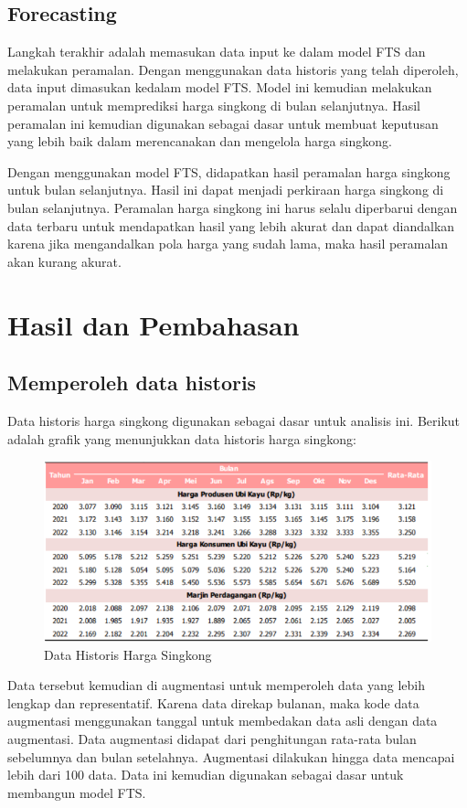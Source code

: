 \documentclass[conference]{IEEEtran}
\begin{document}
    
\subsection{Forecasting}
Langkah terakhir adalah memasukan data input ke dalam model FTS dan melakukan peramalan. Dengan menggunakan data historis yang telah diperoleh, data input dimasukan kedalam model FTS. Model ini kemudian melakukan peramalan untuk memprediksi harga singkong di bulan selanjutnya. Hasil peramalan ini kemudian digunakan sebagai dasar untuk membuat keputusan yang lebih baik dalam merencanakan dan mengelola harga singkong. 

Dengan menggunakan model FTS, didapatkan hasil peramalan harga singkong untuk bulan selanjutnya. Hasil ini dapat menjadi perkiraan harga singkong di bulan selanjutnya. Peramalan harga singkong ini harus selalu diperbarui dengan data terbaru untuk mendapatkan hasil yang lebih akurat dan dapat diandalkan karena jika mengandalkan pola harga yang sudah lama, maka hasil peramalan akan kurang akurat.


\section{Hasil dan Pembahasan}

\subsection{Memperoleh data historis}
Data historis harga singkong digunakan sebagai dasar untuk analisis ini. Berikut adalah grafik yang menunjukkan data historis harga singkong:
\begin{figure}[H]
    \centering
    \includegraphics[width=\columnwidth]{images/Data Historis.png} 
    \caption{Data Historis Harga Singkong}
\end{figure}
Data tersebut kemudian di augmentasi untuk memperoleh data yang lebih lengkap dan representatif. Karena data direkap bulanan, maka kode data augmentasi menggunakan tanggal untuk membedakan data asli dengan data augmentasi. Data augmentasi didapat dari penghitungan rata-rata bulan sebelumnya dan bulan setelahnya. Augmentasi dilakukan hingga data mencapai lebih dari 100 data. Data ini kemudian digunakan sebagai dasar untuk membangun model FTS.
\end{document}
